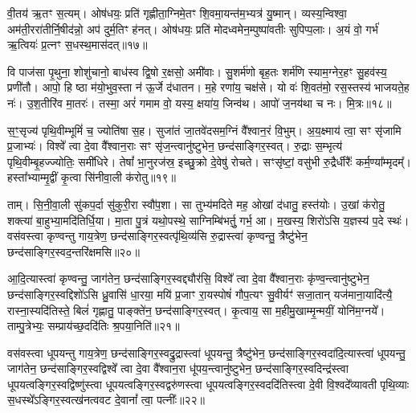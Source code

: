 वी॒तय॑ ऋ॒तꣳ स॒त्यम्। ओष॑धयः॒ प्रति॑ गृह्णीता॒ग्निमे॒तꣳ शि॒वमा॒यन्त॑म॒भ्यत्र॑ यु॒ष्मान्। व्यस्य॒न्विश्वा॒ अम॑ती॒ररा॑तीर्नि॒षीद॑न्नो॒ अप॑ दुर्म॒तिꣳ ह॑नत्। ओष॑धयः॒ प्रति॑ मोदध्वमेन॒म्पुष्पा॑वतीः सुपिप्प॒लाः। अ॒यं वो॒ गर्भ॑ ऋ॒त्वियः॑ प्र॒त्नꣳ स॒धस्थ॒मास॑दत्॥१७॥

{\anuvakamend[{सु॒श॒स्तिभिः॑ शि॒वो भ॑व याहि॒ षट्त्रिꣳ॑शच्च॥४॥}]}

वि पाज॑सा पृ॒थुना॒ शोशु॑चानो॒ बाध॑स्व द्वि॒षो र॒क्षसो॒ अमी॑वाः। सु॒शर्म॑णो बृह॒तः शर्म॑णि स्याम॒ग्नेर॒हꣳ सु॒हव॑स्य॒ प्रणी॑तौ। आपो॒ हि ष्ठा म॑यो॒भुव॒स्ता न॑ ऊ॒र्जे द॑धातन। म॒हे रणा॑य॒ चक्ष॑से। यो वः॑ शि॒वत॑मो॒ रस॒स्तस्य॑ भाजयते॒ह नः॑। उ॒श॒तीरि॑व मा॒तरः॑। तस्मा॒ अरं॑ गमाम वो॒ यस्य॒ क्षया॑य॒ जिन्व॑थ। आपो॑ ज॒नय॑था च नः। मि॒त्रः॥१८॥

स॒ꣳ॒सृज्य॑ पृथि॒वीम्भूमिं॑ च॒ ज्योति॑षा स॒ह। सुजा॑तं जा॒तवे॑दसम॒ग्निं वै᳚श्वान॒रं वि॒भुम्। अ॒य॒क्ष्माय॑ त्वा॒ सꣳ सृ॑जामि प्र॒जाभ्यः॑। विश्वे᳚ त्वा दे॒वा वै᳚श्वान॒राः सꣳ सृ॑ज॒न्त्वानु॑ष्टुभेन॒ छन्द॑साङ्गिर॒स्वत्। रु॒द्राः स॒म्भृत्य॑ पृथि॒वीम्बृ॒हज्ज्योतिः॒ समी॑धिरे। तेषां᳚ भा॒नुरज॑स्र॒ इच्छु॒क्रो दे॒वेषु॑ रोचते। सꣳसृ॑ष्टां॒ वसु॑भी रु॒द्रैर्धीरैः᳚ कर्म॒ण्या᳚म्मृदम्᳚। हस्ता᳚भ्याम्मृ॒द्वीं कृ॒त्वा सि॑नीवा॒ली क॑रोतु॥१९॥

ताम्। सि॒नी॒वा॒ली सु॑कप॒र्दा सु॑कुरी॒रा स्वौ॑प॒शा। सा तुभ्य॑मदिते मह॒ ओखां द॑धातु॒ हस्त॑योः। उ॒खां क॑रोतु॒ शक्त्या॑ बा॒हुभ्या॒मदि॑तिर्धि॒या। मा॒ता पु॒त्रं यथो॒पस्थे॒ साग्निम्बि॑भर्तु॒ गर्भ॒ आ। म॒खस्य॒ शिरो॑\-ऽसि य॒ज्ञस्य॑ प॒दे स्थः॑। वस॑वस्त्वा कृण्वन्तु गाय॒त्रेण॒ छन्द॑साङ्गिर॒स्वत्पृ॑थि॒व्य॑सि रु॒द्रास्त्वा॑ कृण्वन्तु॒ त्रैष्टु॑भेन॒ छन्द॑साङ्गिर॒स्वद॒न्तरि॑क्षमसि॥२०॥

आ॒दि॒त्यास्त्वा॑ कृण्वन्तु॒ जाग॑तेन॒ छन्द॑साङ्गिर॒स्वद्द्यौर॑सि॒ विश्वे᳚ त्वा दे॒वा वै᳚श्वान॒राः कृ॑ण्व॒न्त्वानु॑ष्टुभेन॒ छन्द॑साङ्गिर॒स्वद्दिशो॑\-ऽसि ध्रु॒वासि॑ धा॒रया॒ मयि॑ प्र॒जाꣳ रा॒यस्पोषं॑ गौप॒त्यꣳ सु॒वीर्यꣳ॑ सजा॒तान् यज॑माना॒यादि॑त्यै॒ रास्ना॒स्यदि॑तिस्ते॒ बिलं॑ गृह्णातु॒ पाङ्क्ते॑न॒ छन्द॑साङ्गिर॒स्वत्। कृ॒त्वाय॒ सा म॒हीमु॒खाम्मृ॒न्मयीं॒ योनि॑म॒ग्नये᳚। ताम्पु॒त्रेभ्यः॒ सम्प्राय॑च्छ॒ददि॑तिः श्र॒पया॒निति॑॥२१॥

{\anuvakamend[{मि॒त्रः क॑रोत्व॒न्तरि॑क्षमसि॒ प्र च॒त्वारि॑ च॥५॥}]}

वस॑वस्त्वा धूपयन्तु गाय॒त्रेण॒ छन्द॑साङ्गिर॒स्वद्रु॒द्रास्त्वा॑ धूपयन्तु॒ त्रैष्टु॑भेन॒ छन्द॑साङ्गिर॒स्वदा॑दि॒त्यास्त्वा॑ धूपयन्तु॒ जाग॑तेन॒ छन्द॑साङ्गिर॒स्वद्विश्वे᳚ त्वा दे॒वा वै᳚श्वान॒रा धू॑पय॒न्त्वानु॑ष्टुभेन॒ छन्द॑साङ्गिर॒स्वदिन्द्र॑स्त्वा धूपयत्वङ्गिर॒स्वद्विष्णु॑स्त्वा धूपयत्वङ्गिर॒स्वद्वरु॑णस्त्वा धूपयत्वङ्गिर॒स्वददि॑तिस्त्वा दे॒वी वि॒श्वदे᳚व्यावती पृथि॒व्याः स॒धस्थे᳚\-ऽङ्गिर॒स्वत्ख॑नत्ववट दे॒वानां᳚ त्वा॒ पत्नीः᳚॥२२॥

